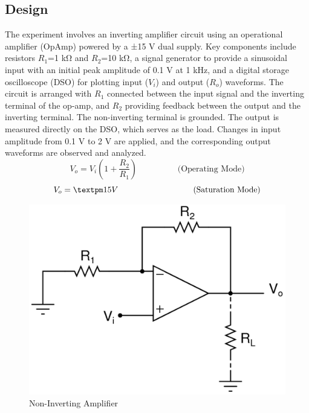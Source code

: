 \documentclass[12pt]{article}
\begin{document}
\subsection{Design}
The experiment involves an inverting amplifier circuit using an operational amplifier (OpAmp) powered by a ±15 V dual supply. Key components include resistors \(R_{1} \)=1 kΩ and \(R_{2} \)=10 kΩ, a signal generator to provide a sinusoidal input with an initial peak amplitude of 0.1 V at 1 kHz, and a digital storage oscilloscope (DSO) for plotting input (\(V_{i} \)) and output (\(R_{o} \)) waveforms. The circuit is arranged with \(R_{1} \) connected between the input signal and the inverting terminal of the op-amp, and \(R_{2} \) providing feedback between the output and the inverting terminal. The non-inverting terminal is grounded. The output is measured directly on the DSO, which serves as the load. Changes in input amplitude from 0.1 V to 2 V are applied, and the corresponding output waveforms are observed and analyzed.
\begin{equation}
     V_{o} = V_{i}(1 + \frac{R_{2}}{R_{1}})   \hspace{2cm} \text{(Operating Mode)}
\end{equation}     
\begin{equation}
     V_{o} = ± 15V   \hspace{3.2cm} \text{(Saturation Mode)}
\end{equation}     

\begin{figure}[h!]
\centering
\includegraphics[scale = 0.25]{5.png}
\caption{Non-Inverting Amplifier}
\end{figure}
\end{document}
